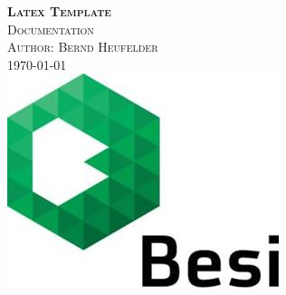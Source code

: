\documentclass[a4paper, 10pt]{scrartcl}
\begin{document}
	\begin{titlepage}
		\ClearShipoutPicture
		\center 		
		\textsc{\huge \bfseries Latex Template}\\[1cm] 
		\textsc{\Large Documentation}\\[0.5cm] 
		\textsc{\large Author: Bernd Heufelder}\\[0.5cm] 
		{\large \today}\\[1cm] 
		\includegraphics[width=0.3\linewidth]{./pics/BesiLogo.jpg}\\[1cm]
		\begin{flushleft}
			\tableofcontents
		\end{flushleft}
	\end{titlepage}
\end{document}
